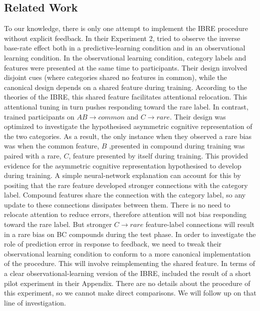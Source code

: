 \documentclass[10pt,letterpaper]{article}
\begin{document}
\subsection{Related Work}

To our knowledge, there is only one attempt to implement the IBRE procedure without explicit feedback.
In their Experiment 2,  tried to observe the inverse base-rate effect both in a predictive-learning condition and in an observational learning condition.
In the observational learning condition, category labels and features were presented at the same time to participants.
Their design involved disjoint cues (where categories shared no features in common), while the canonical design depends on a shared feature during training.
According to the theories of the IBRE, this shared feature facilitates attentional relocation.
This attentional tuning in turn pushes responding toward the rare label.
In contrast,  trained participants on $AB \to common$ and $C \to rare$.
Their design was optimized to investigate the hypothesised asymmetric cognitive representation of the two categories.
As a result, the only instance when they observed a rare bias was when the common feature, $B$ ,presented in compound during training was paired with a rare, $C$, feature presented by itself during training.
This provided evidence for the asymmetric cognitive representation \cite{kruschke2001inverse} hypothesised to develop during training.
A simple neural-network explanation can account for this by positing that the rare feature developed stronger connections with the category label.
Compound features share the connection with the category label, so any update to these connections dissipates between them.
There is no need to relocate attention to reduce errors, therefore attention will not bias responding toward the rare label.
But stronger $C \to rare$ feature-label connections will result in a rare bias on BC compounds during the test phase.
In order to investigate the role of prediction error in response to feedback, we need to tweak their observational learning condition to conform to a more canonical implementation of the procedure.
This will involve reimplementing the shared feature.
In terms of a clear observational-learning version of the IBRE,  included the result of a short pilot experiment in their Appendix.
There are no details about the procedure of this experiment, so we cannot make direct comparisons.
We will follow up on that line of investigation.
\end{document}
